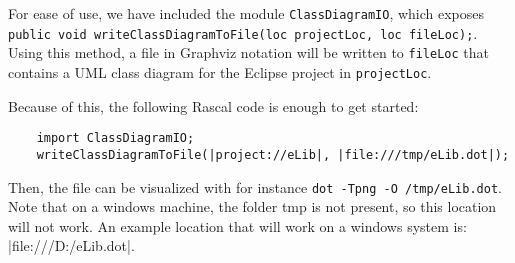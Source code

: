 	For ease of use, we have included the module \texttt{ClassDiagramIO}, which exposes \texttt{public void writeClassDiagramToFile(loc projectLoc, loc fileLoc);}.
	Using this method, a file in Graphviz notation will be written to \texttt{fileLoc} that contains a UML class diagram for the Eclipse project in \texttt{projectLoc}.
	
	Because of this, the following Rascal code is enough to get started:
	
	\begin{lstlisting}
	import ClassDiagramIO;
	writeClassDiagramToFile(|project://eLib|, |file:///tmp/eLib.dot|);
	\end{lstlisting}
	
	Then, the file can be visualized with for instance \texttt{dot -Tpng -O /tmp/eLib.dot}.
	Note that on a windows machine, the folder tmp is not present, so this location will not work. 
	An example location that will work on a windows system is: |file:///D:/eLib.dot|.
